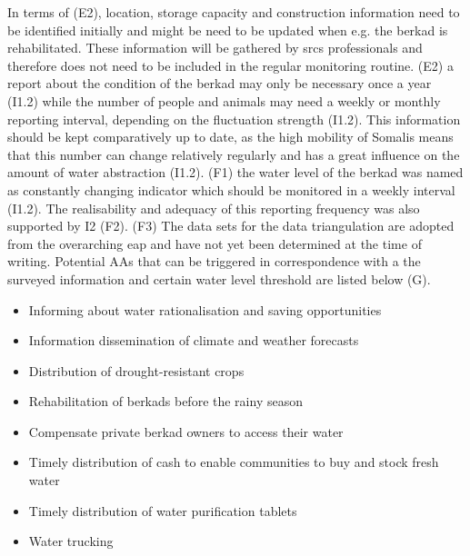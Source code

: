 
In terms of (E2), location, storage capacity and construction information need to be identified initially and might be need to be updated when e.g. the berkad is rehabilitated. These information will be gathered by \acrshort{srcs} professionals and therefore does not need to be included in the regular monitoring routine. (E2) a report about the condition of the berkad may only be necessary once a year (I1.2) while the number of people and animals may need a weekly or monthly reporting interval, depending on the fluctuation strength (I1.2). This information should be kept comparatively up to date, as the high mobility of Somalis means that this number can change relatively regularly and has a great influence on the amount of water abstraction (I1.2).\newline
(F1) the water level of the berkad was named as constantly changing indicator which should be monitored in a weekly interval (I1.2). The realisability and adequacy of this reporting frequency was also supported by I2 (F2). (F3) The data sets for the data triangulation are adopted from the overarching \acrshort{eap} and have not yet been determined at the time of writing.\newline
Potential AAs that can be triggered in correspondence with a the surveyed information and certain water level threshold are listed below (G). 

\begin{itemize}
    \item Informing about water rationalisation and saving opportunities
    \item Information dissemination of climate and weather forecasts
    \item Distribution of drought-resistant crops
    \item Rehabilitation of berkads before the rainy season 
    \item Compensate private berkad owners to access their water
    \item Timely distribution of cash to enable communities to buy and stock fresh water
    \item Timely distribution of water purification tablets 
    \item Water trucking
\end{itemize}

